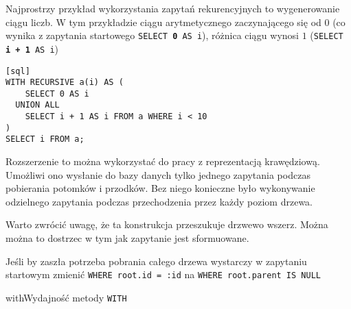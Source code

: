 Najprostrzy przykład wykorzystania zapytań rekurencyjnych to wygenerowanie ciągu liczb. 
W tym przykładzie ciągu arytmetycznego zaczynającego się od $0$ (co wynika z zapytania startowego \texttt{SELECT \textbf{0} AS i}), 
różnica ciągu wynosi $1$ (\texttt{SELECT \textbf{i + 1} AS i})

\begin{verbatim}[sql]
WITH RECURSIVE a(i) AS (
    SELECT 0 AS i
  UNION ALL
    SELECT i + 1 AS i FROM a WHERE i < 10
)
SELECT i FROM a;
\end{verbatim}


Rozszerzenie to można wykorzystać do pracy z reprezentacją krawędziową. 
Umożliwi ono wysłanie do bazy danych tylko jednego zapytania podczas pobierania potomków i przodków. 
Bez niego konieczne było wykonywanie odzielnego zapytania podczas przechodzenia przez każdy poziom drzewa.






Warto zwrócić uwagę, że ta konstrukcja przeszukuje drzwewo wszerz. Można można to dostrzec w tym jak zapytanie jest sformuowane. 

Jeśli by zaszła potrzeba pobrania całego drzewa wystarczy w zapytaniu startowym zmienić \texttt{WHERE root.id = :id} na \texttt{WHERE root.parent IS NULL}



\begin{qxtab}{with}{Wydajność metody \texttt{WITH}}
\end{qxtab}

